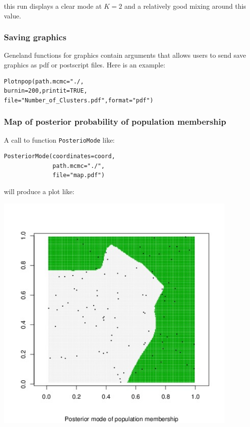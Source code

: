 \documentclass[a4paper,10pt]{article}
\begin{document}
this run displays a clear mode at $K=2$ and a relatively good mixing around this value.


\subsubsection{Saving graphics}

{\sc Geneland} functions for graphics contain arguments that allows users to send save graphics as pdf or postscript files. 
Here is an example:

\begin{verbatim}
Plotnpop(path.mcmc="./,
burnin=200,printit=TRUE,
file="Number_of_Clusters.pdf",format="pdf")
\end{verbatim}



\clearpage
\subsubsection{Map of posterior probability of population membership}

A call to function \texttt{PosterioMode} like:\\

\begin{verbatim}
PosteriorMode(coordinates=coord,
              path.mcmc="./",
              file="map.pdf")
\end{verbatim}




will produce a plot like:

\includegraphics[width=12cm]{fig/map.jpeg}
\end{document}
